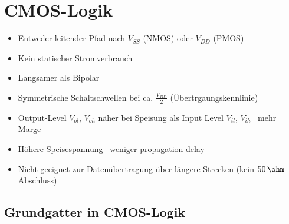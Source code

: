 \section{CMOS-Logik}

\begin{itemize}
    \item Entweder leitender Pfad nach $V_{SS}$ (NMOS) oder $V_{DD}$ (PMOS)
    \item Kein statischer Stromverbrauch
    \item Langsamer als Bipolar
    \item Symmetrische Schaltschwellen bei ca. $\frac{V_{DD}}{2}$ (Übertrgaungskennlinie)
    \item Output-Level $V_{ol}$, $V_{oh}$ näher bei Speisung als Input Level $V_{il}$, $V_{ih}$ \textrightarrow\ mehr Marge
    \item Höhere Speisespannung \textrightarrow\ weniger propagation delay
    \item Nicht geeignet zur Datenübertragung über längere Strecken (kein $50 \, \ohm$ Abschluss)
\end{itemize}


\subsection{Grundgatter in CMOS-Logik}


